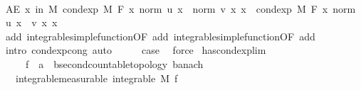 \begin{isabellebody}
\ \ \isamarkupfalse%
\ \isamarkupfalse%
\ {\isachardoublequoteopen}AE\ x\ in\ M{\isachardot}{\kern0pt}\ cond{\isacharunderscore}{\kern0pt}exp\ M\ F\ {\isacharparenleft}{\kern0pt}{\isasymlambda}x{\isachardot}{\kern0pt}\ norm\ {\isacharparenleft}{\kern0pt}u\ x{\isacharparenright}{\kern0pt}\ {\isacharplus}{\kern0pt}\ norm\ {\isacharparenleft}{\kern0pt}v\ x{\isacharparenright}{\kern0pt}{\isacharparenright}{\kern0pt}\ x\ {\isacharequal}{\kern0pt}\ cond{\isacharunderscore}{\kern0pt}exp\ M\ F\ {\isacharparenleft}{\kern0pt}{\isasymlambda}x{\isachardot}{\kern0pt}\ norm\ {\isacharparenleft}{\kern0pt}u\ x\ {\isacharplus}{\kern0pt}\ v\ x{\isacharparenright}{\kern0pt}{\isacharparenright}{\kern0pt}\ x{\isachardoublequoteclose}\ \isamarkupfalse%
\ add{\isacharparenleft}{\kern0pt}{}{\isacharparenright}{\kern0pt}\ integrable{\isacharunderscore}{\kern0pt}simple{\isacharunderscore}{\kern0pt}function{\isacharbrackleft}{\kern0pt}OF\ add{\isacharparenleft}{\kern0pt}{}{\isacharcomma}{\kern0pt}{}{\isacharparenright}{\kern0pt}{\isacharbrackright}{\kern0pt}\ integrable{\isacharunderscore}{\kern0pt}simple{\isacharunderscore}{\kern0pt}function{\isacharbrackleft}{\kern0pt}OF\ add{\isacharparenleft}{\kern0pt}{}{\isacharcomma}{\kern0pt}{}{\isacharparenright}{\kern0pt}{\isacharbrackright}{\kern0pt}\ \isamarkupfalse%
\ {\isacharparenleft}{\kern0pt}intro\ cond{\isacharunderscore}{\kern0pt}exp{\isacharunderscore}{\kern0pt}cong{\isacharcomma}{\kern0pt}\ auto{\isacharparenright}{\kern0pt}\isanewline
\ \ \isamarkupfalse%
\ \isamarkupfalse%
\ {\isacharquery}{\kern0pt}case\ \isamarkupfalse%
\ force\isanewline
{}\isamarkupfalse%
%
\endisatagproof
{\isafoldproof}%
%
\isadelimproof
\isanewline
%
\endisadelimproof
\isanewline
{}\isamarkupfalse%
\ has{\isacharunderscore}{\kern0pt}cond{\isacharunderscore}{\kern0pt}exp{\isacharunderscore}{\kern0pt}lim{\isacharcolon}{\kern0pt}\isanewline
\ \ \ \ \ f\ {\isacharcolon}{\kern0pt}{\isacharcolon}{\kern0pt}\ {\isachardoublequoteopen}{\isacharprime}{\kern0pt}a\ {\isasymRightarrow}\ {\isacharprime}{\kern0pt}b{\isacharcolon}{\kern0pt}{\isacharcolon}{\kern0pt}{\isacharbraceleft}{\kern0pt}second{\isacharunderscore}{\kern0pt}countable{\isacharunderscore}{\kern0pt}topology{\isacharcomma}{\kern0pt}\ banach{\isacharbraceright}{\kern0pt}{\isachardoublequoteclose}\isanewline
\ \ \ integrable{\isacharbrackleft}{\kern0pt}measurable{\isacharbrackright}{\kern0pt}{\isacharcolon}{\kern0pt}\ {\isachardoublequoteopen}integrable\ M\ f{\isachardoublequoteclose}\isanewline

\end{isabellebody}

